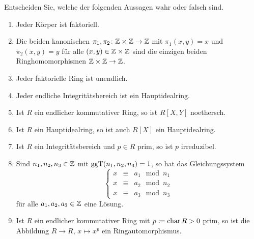 \begin{question}[subtitle = Multiple Choice]
  Entscheiden Sie, welche der folgenden Aussagen wahr oder falsch sind.
  \begin{enumerate}
    \item
      Jeder Körper ist faktoriell.
    \item
      Die beiden kanonischen $\pi_1, \pi_2 \colon \mathbb{Z} \times \mathbb{Z} \to \mathbb{Z}$ mit $\pi_1(x,y) = x$ und $\pi_2(x,y) = y$ für alle $(x,y) \in \mathbb{Z} \times \mathbb{Z}$ sind die einzigen beiden Ringhomomorphismen $\mathbb{Z} \times \mathbb{Z} \to \mathbb{Z}$.
    \item
      Jeder faktorielle Ring ist unendlich.
    \item
      Jeder endliche Integritätsbereich ist ein Hauptidealring.
    \item
      Ist $R$ ein endlicher kommutativer Ring, so ist $R[X,Y]$ noethersch.
    \item
      Ist $R$ ein Hauptidealring, so ist auch $R[X]$ ein Hauptidealring.
    \item
      Ist $R$ ein Integritätsbereich und $p \in R$ prim, so ist $p$ irreduzibel.
    \item
      Sind $n_1, n_2, n_3 \in \mathbb{Z}$ mit $\operatorname{ggT}(n_1, n_2, n_3) = 1$, so hat das Gleichungssystem
      \[
        \left\{
          \begin{array}{ccc}
            x &\equiv&  a_1 \mod n_1
            \\
            x &\equiv&  a_2 \mod n_2
            \\
            x &\equiv&  a_3 \mod n_3
          \end{array}
        \right.
      \]
      für alle $a_1, a_2, a_3 \in \mathbb{Z}$ eine Lösung.
    \item
      Ist $R$ ein endlicher kommutativer Ring mit $p \coloneqq \operatorname{char} R > 0$ prim, so ist die Abbildung $R \to R$, $x \mapsto x^p$ ein Ringautomorphismus.
  \end{enumerate}
\end{question}


